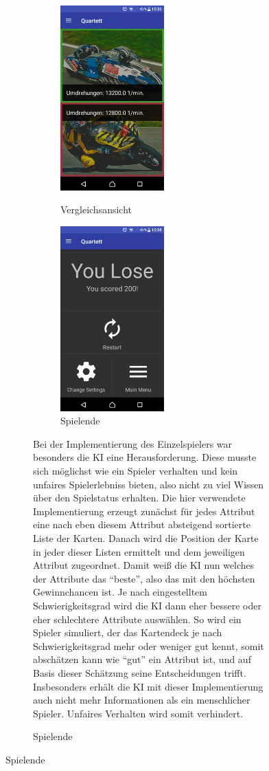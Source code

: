 \documentclass{scrartcl}
\begin{document}
\begin{figure}[!ht]
\begin{figure}[!ht]
\begin{figure}
  \centering
  \begin{minipage}{0.45\textwidth}
    \centering
    \includegraphics[width=4cm]{img/game_compare.png}
    \caption{Vergleichsansicht}
  \end{minipage}
  \hfill
  \begin{minipage}{0.45\textwidth}
    \centering
    \includegraphics[width=4cm]{img/game_end.png}
    \caption{Spielende}
  \end{minipage}
\end{figure}

\noindent
Bei der Implementierung des Einzelspielers war besonders die KI eine
Herausforderung. Diese musste sich möglichst wie ein Spieler verhalten und kein
unfaires Spielerlebniss bieten, also nicht zu viel Wissen über den Spielstatus
erhalten. Die hier verwendete Implementierung erzeugt zunächst für jedes
Attribut eine nach eben diesem Attribut absteigend sortierte Liste der Karten.
Danach wird die Position der Karte in jeder dieser Listen ermittelt und dem
jeweiligen Attribut zugeordnet. Damit weiß die KI nun welches der Attribute das
\enquote{beste}, also das mit den höchsten Gewinnchancen ist. Je nach
eingestelltem Schwierigkeitsgrad wird die KI dann eher bessere oder eher
schlechtere Attribute auswählen. So wird ein Spieler simuliert, der das
Kartendeck je nach Schwierigkeitsgrad mehr oder weniger gut kennt, somit
abschätzen kann wie \enquote{gut} ein Attribut ist, und auf Basis dieser
Schätzung seine Entscheidungen trifft. Insbesonders erhält die KI mit dieser
Implementierung auch nicht mehr Informationen als ein menschlicher Spieler.
Unfaires Verhalten wird somit verhindert.


\end{figure}
\end{figure}
\end{document}
